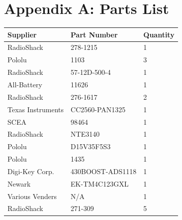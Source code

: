 \documentclass[11pt]{report}
\begin{document}
\begin{spacing}{1.5}
\begin{tabular}{lllll}
\end{tabular}

{}

\clearpage

\section*{Appendix A: Parts List}

\begin{tabular}{lll}
Supplier & Part Number & Quantity \\
\hline
RadioShack & 278-1215 & 1 \\
Pololu & 	1103	 & 3 \\
RadioShack & 57-12D-500-4 & 	1 \\
All-Battery & 	11626	 & 1 \\
RadioShack & 276-1617 & 2 \\
Texas Instruments & 	CC2560-PAN1325 & 	1 \\
SCEA & 	98464	 & 1 \\
RadioShack & NTE3140 & 1 \\
Pololu & 	 D15V35F5S3	 & 1 \\
Pololu & 	1435	 & 1 \\
Digi-Key Corp. & 	430BOOST-ADS1118 & 	1 \\
Newark & 	 EK-TM4C123GXL	 & 1 \\
Various Venders & 	N/A & 	1 \\
RadioShack & 271-309 & 5 \\
\end{tabular}



\end{spacing}
\end{document}
